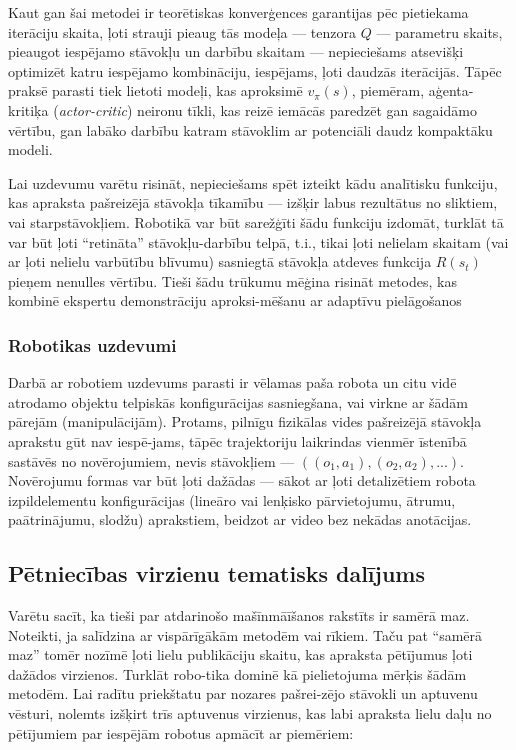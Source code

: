 \documentclass[12pt, a4paper]{article}
\numberwithin{equation}{section} %
\begin{document}
Kaut gan šai metodei ir teorētiskas konverģences garantijas pēc pietiekama iterāciju skaita, ļoti strauji pieaug tās modeļa --- tenzora $Q$ --- parametru skaits, pieaugot iespējamo stāvokļu un darbību skaitam --- nepieciešams atsevišķi optimizēt katru iespējamo kombināciju, iespējams, ļoti daudzās iterācijās. Tāpēc praksē parasti tiek lietoti modeļi, kas aproksimē $v_{\pi}(s)$, piemēram, aģenta-kritiķa (\textit{actor-critic}) neironu tīkli, kas reizē iemācās paredzēt gan sagaidāmo vērtību, gan labāko darbību katram stāvoklim ar potenciāli daudz kompaktāku modeli.

Lai uzdevumu varētu risināt, nepieciešams spēt izteikt kādu analītisku funkciju, kas apraksta pašreizējā stāvokļa tīkamību --- izšķir labus rezultātus no sliktiem, vai starpstāvokļiem. Robotikā var būt sarežģīti šādu funkciju izdomāt, turklāt tā var būt ļoti ``retināta'' stāvokļu-darbību telpā, t.i., tikai ļoti nelielam skaitam (vai ar ļoti nelielu varbūtību blīvumu) sasniegtā stāvokļa atdeves funkcija $R(s_t)$ pieņem nenulles vērtību. Tieši šādu trūkumu mēģina risināt metodes, kas kombinē ekspertu demonstrāciju aproksi-mēšanu ar adaptīvu pielāgošanos\cite{nair2018overcoming}

\subsubsection{Robotikas uzdevumi}

Darbā ar robotiem uzdevums parasti ir vēlamas paša robota un citu vidē atrodamo objektu telpiskās konfigurācijas sasniegšana, vai virkne ar šādām pārejām (manipulācijām). Protams, pilnīgu fizikālas vides pašreizējā stāvokļa aprakstu gūt nav iespē-jams, tāpēc trajektoriju laikrindas vienmēr īstenībā sastāvēs no novērojumiem, nevis stāvokļiem --- $((o_1,a_1), (o_2, a_2), ...)$. Novērojumu formas var būt ļoti dažādas --- sākot ar ļoti detalizētiem robota izpildelementu konfigurācijas (lineāro vai lenķisko pārvietojumu, ātrumu, paātrinājumu, slodžu) aprakstiem, beidzot ar video bez nekādas anotācijas.

\subsection{Pētniecības virzienu tematisks dalījums}

Varētu sacīt, ka tieši par atdarinošo mašīnmāīšanos rakstīts ir samērā maz. Noteikti, ja salīdzina ar vispārīgākām metodēm vai rīkiem. Taču pat ``samērā maz'' tomēr nozīmē ļoti lielu publikāciju skaitu, kas apraksta pētījumus ļoti dažādos virzienos. Turklāt robo-tika dominē kā pielietojuma mērķis šādām metodēm. Lai radītu priekštatu par nozares pašrei-zējo stāvokli un aptuvenu vēsturi, nolemts izšķirt trīs aptuvenus virzienus, kas labi apraksta lielu daļu no pētījumiem par iespējām robotus apmācīt ar piemēriem:
\end{document}
